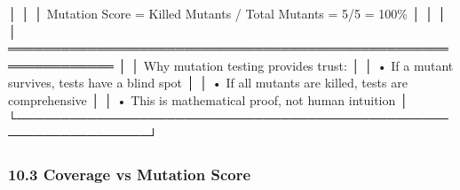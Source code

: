 \documentclass[
]{article}
\newenvironment{Shaded}{}{}
\newcommand{\NormalTok}[1]{#1}
\begin{document}
\begin{Shaded}
\begin{Highlighting}[]
\NormalTok{│                                                                  │}
\NormalTok{│  Mutation Score = Killed Mutants / Total Mutants = 5/5 = 100\%   │}
\NormalTok{│                                                                  │}
\NormalTok{│  ══════════════════════════════════════════════════════════════  │}
\NormalTok{│  Why mutation testing provides trust:                           │}
\NormalTok{│  • If a mutant survives, tests have a blind spot                │}
\NormalTok{│  • If all mutants are killed, tests are comprehensive           │}
\NormalTok{│  • This is mathematical proof, not human intuition              │}
\NormalTok{└─────────────────────────────────────────────────────────────────┘}
\end{Highlighting}
\end{Shaded}

\hypertarget{103-coverage-vs-mutation-score}{%
\subsubsection{10.3 Coverage vs Mutation
Score}\label{103-coverage-vs-mutation-score}}
\end{document}
